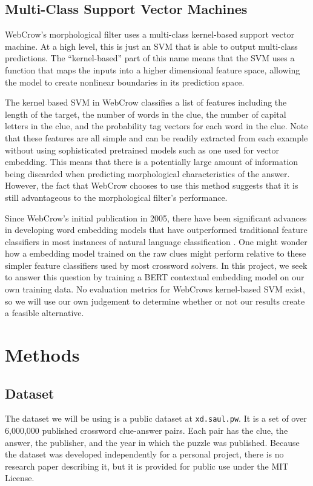 \documentclass[11pt]{article}
\begin{document}
\subsection{Multi-Class Support Vector Machines}
WebCrow's morphological filter uses a multi-class kernel-based support vector machine. At a high level, this is just an SVM that is able to output multi-class predictions. The ``kernel-based'' part of this name means that the SVM uses a function that maps the inputs into a higher dimensional feature space, allowing the model to create nonlinear boundaries in its prediction space.

The kernel based SVM in WebCrow classifies a list of features including the length of the target, the number of words in the clue, the number of capital letters in the clue, and the probability tag vectors for each word in the clue. Note that these features are all simple and can be readily extracted from each example without using sophisticated pretrained models such as one used for vector embedding. This means that there is a potentially large amount of information being discarded when predicting morphological characteristics of the answer. However, the fact that WebCrow chooses to use this method suggests that it is still advantageous to the morphological filter's performance.

Since WebCrow's initial publication in 2005, there have been significant advances in developing word embedding models that have outperformed traditional feature classifiers in most instances of natural language classification \cite{Mikolov13-word2vec}. One might wonder how a embedding model trained on the raw clues might perform relative to these simpler feature classifiers used by most crossword solvers. In this project, we seek to answer this question by training a BERT contextual embedding model on our own training data. No evaluation metrics for WebCrows kernel-based SVM exist, so we will use our own judgement to determine whether or not our results create a feasible alternative.
\section{Methods}
\subsection{Dataset}
The dataset we will be using is a public dataset at \verb,xd.saul.pw,. It is a set of over 6,000,000 published crossword clue-answer pairs. Each pair has the clue, the answer, the publisher, and the year in which the puzzle was published. Because the dataset was developed independently for a personal project, there is no research paper describing it, but it is provided for public use under the MIT License.
\end{document}
